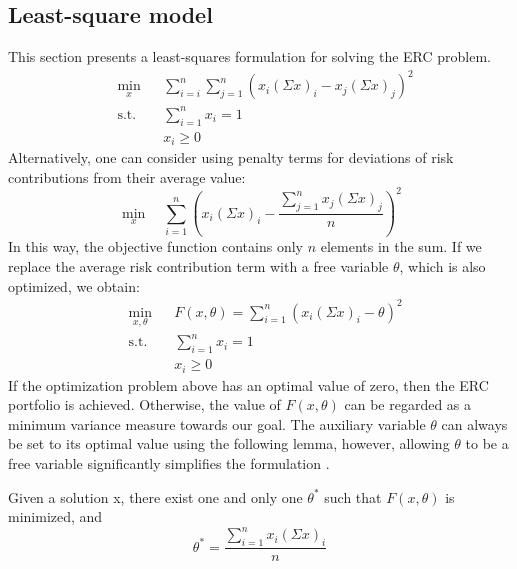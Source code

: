 \subsection{Least-square model}
This section presents a least-squares formulation for solving the ERC problem.
\begin{equation}
\begin{aligned}
& \min_x
&& \sum_{i=i}^n \sum_{j=1}^{n}\left(x_i(\Sigma x)_i - x_j(\Sigma x)_j\right)^2\\
& \text{s.t.}
&&\sum_{i=1}^n x_i =1\\
&&&x_i \geq 0
\end{aligned}
\end{equation}
Alternatively, one can consider using penalty terms for deviations of risk contributions from their average value:
\begin{equation}\label{eq:ls1} 
\min_x \hspace{1em}\sum_{i=1}^{n}\left(x_i(\Sigma x)_i - \frac{\sum_{j=1}^{n} x_j(\Sigma x)_j}{n}\right)^2
\end{equation}
In this way, the objective function contains only $n$ elements in the sum. If we replace the average risk contribution term with a free variable $\theta$, which is also optimized, we obtain:
\begin{equation}\label{eq:ls}
\begin{aligned}
& \min_{x,\theta}
&& F(x,\theta) = \sum_{i=1}^n (x_i(\Sigma x)_i - \theta)^2\\
& \text{s.t.}
&&\sum_{i=1}^n x_i =1\\
&&&x_i \geq 0
\end{aligned}
\end{equation}
If the optimization problem above has an optimal value of zero, then the ERC portfolio is achieved. Otherwise, the value of $F(x,\theta)$ can be regarded as a minimum variance measure towards our goal. The auxiliary variable $\theta$ can always be set to its optimal value using the following lemma, however, allowing $\theta$ to be a free variable significantly simplifies the formulation \cite{tutuncu}. 
\begin{lemma} Given a solution x, there exist one and only one $\theta^*$ such that $F(x,\theta)$ is minimized, and
\begin{equation}
\theta^* = \frac{\sum_{i=1}^n x_i(\Sigma x)_i}{n}
\end{equation}
\end{lemma}

